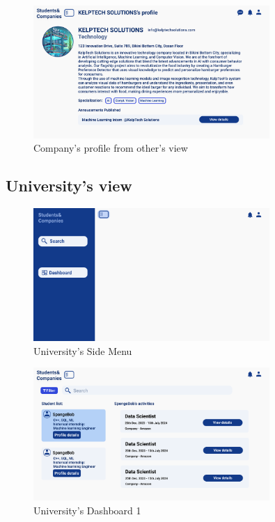 \begin{figure}
    \centering
    \includegraphics[width=0.8\textwidth]{Images/UI/Company profile.png}
    \caption{Company's profile from other's view}\label{fig:Company's profile from other's view}
\end{figure}


\subsection{University's view}

\begin{figure}
    \centering
    \includegraphics[width=0.8\textwidth]{Images/UI/Layout-University.png}
    \caption{University's Side Menu}\label{fig:University_view}
\end{figure}

\begin{figure}
    \centering
    \includegraphics[width=0.8\textwidth]{Images/UI/Dashboard 1-university.png}
    \caption{University's Dashboard 1}\label{fig:DashboardUniversity1}
\end{figure}

